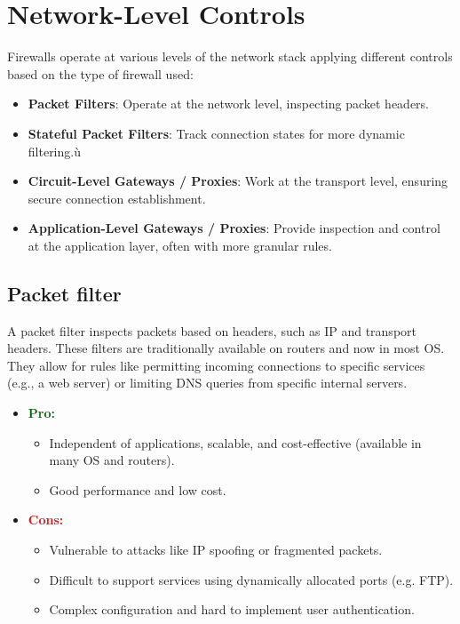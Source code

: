\section{Network-Level Controls}
Firewalls operate at various levels of the network stack applying different controls based on the type of firewall used:
\begin{itemize}
    \item \textbf{Packet Filters}: Operate at the network level, inspecting packet headers.
    \item \textbf{Stateful Packet Filters}: Track connection states for more dynamic filtering.ù
    \item \textbf{Circuit-Level Gateways / Proxies}: Work at the transport level, ensuring secure connection establishment.
    \item \textbf{Application-Level Gateways / Proxies}: Provide inspection and control at the application layer, often with more granular rules.
\end{itemize}

 \subsection{Packet filter}
 A packet filter inspects packets based on headers, such as IP and transport headers. These filters are traditionally available on routers and now in most OS. They allow for rules like permitting incoming connections to specific services (e.g., a web server) or limiting DNS queries from specific internal servers.

\begin{itemize}
    \item \textcolor{darkgreen}{\textbf{Pro:}} 
    \begin{itemize}
        \item Independent of applications, scalable, and cost-effective (available in many OS and routers).
        \item Good performance and low cost.
    \end{itemize}
    \item \textcolor{red}{\textbf{Cons:}} 
    \begin{itemize}
        \item Vulnerable to attacks like IP spoofing or fragmented packets.
        \item Difficult to support services using dynamically allocated ports (e.g. FTP).
        \item Complex configuration and hard to implement user authentication.
    \end{itemize}
\end{itemize}

